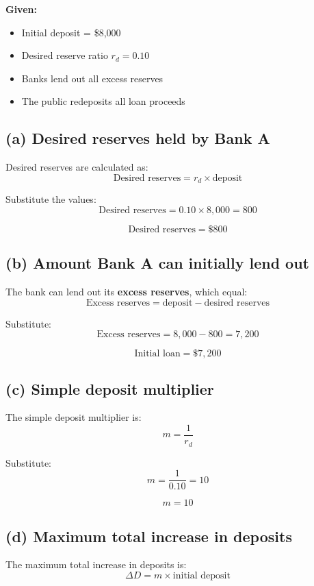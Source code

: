 \documentclass[12pt]{article}
\begin{document}
\textbf{Given:}
\begin{itemize}
    \item Initial deposit = \$8{,}000
    \item Desired reserve ratio \(r_d = 0.10\)
    \item Banks lend out all excess reserves
    \item The public redeposits all loan proceeds
\end{itemize}

\subsection*{(a) Desired reserves held by Bank A}

Desired reserves are calculated as:
\[
\text{Desired reserves} = r_d \times \text{deposit}
\]

Substitute the values:
\[
\text{Desired reserves} = 0.10 \times 8{,}000 = 800
\]

\[
\boxed{\text{Desired reserves} = \$800}
\]

\subsection*{(b) Amount Bank A can initially lend out}

The bank can lend out its \textbf{excess reserves}, which equal:
\[
\text{Excess reserves} = \text{deposit} - \text{desired reserves}
\]

Substitute:
\[
\text{Excess reserves} = 8{,}000 - 800 = 7{,}200
\]

\[
\boxed{\text{Initial loan} = \$7{,}200}
\]

\subsection*{(c) Simple deposit multiplier}

The simple deposit multiplier is:
\[
m = \frac{1}{r_d}
\]

Substitute:
\[
m = \frac{1}{0.10} = 10
\]

\[
\boxed{m = 10}
\]

\subsection*{(d) Maximum total increase in deposits}

The maximum total increase in deposits is:
\[
\Delta D = m \times \text{initial deposit}
\]
\end{document}
